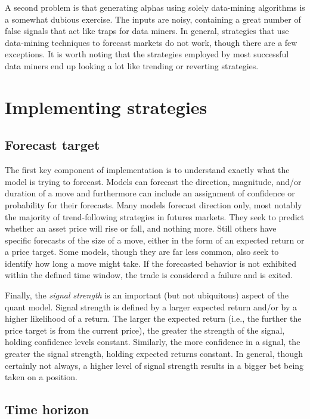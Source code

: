 \documentclass[11pt]{report}
\begin{document}
			A second problem is that generating alphas using solely data-mining algorithms is a somewhat dubious exercise. The inputs are noisy, containing a great number of false signals that act like traps for data miners. In general, strategies that use data-mining techniques to forecast markets do not work, though there are a few exceptions. It is worth noting that the strategies employed by most successful data miners end up looking a lot like trending or reverting strategies.

		\section{Implementing strategies}

			\subsection{Forecast target}

				The first key component of implementation is to understand exactly what the model is trying to forecast. Models can forecast the direction, magnitude, and/or duration of a move and furthermore can include an assignment of confidence or probability for their forecasts. Many models forecast direction only, most notably the majority of trend-following strategies in futures markets. They seek to predict whether an asset price will rise or fall, and nothing more. Still others have specific forecasts of the size of a move, either in the form of an expected return or a price target. Some models, though they are far less common, also seek to identify how long a move might take. If the forecasted behavior is not exhibited within the defined time window, the trade is considered a failure and is exited.

				Finally, the \textit{signal strength} is an important (but not ubiquitous) aspect of the quant model. Signal strength is defined by a larger expected return and/or by a higher likelihood of a return. The larger the expected return (i.e., the further the price target is from the current price), the greater the strength of the signal, holding confidence levels constant. Similarly, the more confidence in a signal, the greater the signal strength, holding expected returns constant. In general, though certainly not always, a higher level of signal strength results in a bigger bet being taken on a position.


			\subsection{Time horizon}
\end{document}
